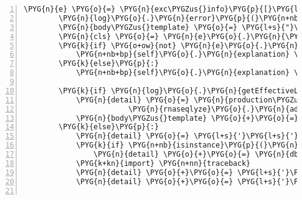 \begin{Verbatim}[commandchars=\\\{\},numbers=left,firstnumber=1,stepnumber=5]
        \PYG{n}{e} \PYG{o}{=} \PYG{n}{exc\PYGZus{}info}\PYG{p}{[}\PYG{l+m+mi}{1}\PYG{p}{]}
        \PYG{n}{log}\PYG{o}{.}\PYG{n}{error}\PYG{p}{(}\PYG{n+nb}{repr}\PYG{p}{(}\PYG{n}{e}\PYG{p}{)}\PYG{p}{)}
        \PYG{n}{body\PYGZus{}template} \PYG{o}{=} \PYG{l+s}{"}\PYG{l+s}{\textless{}b\textgreater{}\PYGZdl{}\PYGZob{}explanation\PYGZcb{}\textless{}/b\textgreater{}}\PYG{l+s+se}{\PYGZbs{}n}\PYG{l+s}{\textless{}hr/\textgreater{}}\PYG{l+s+se}{\PYGZbs{}n}\PYG{l+s}{"}
        \PYG{n}{cls} \PYG{o}{=} \PYG{n}{e}\PYG{o}{.}\PYG{n}{\PYGZus{}\PYGZus{}class\PYGZus{}\PYGZus{}}\PYG{o}{.}\PYG{n}{\PYGZus{}\PYGZus{}name\PYGZus{}\PYGZus{}}
        \PYG{k}{if} \PYG{o+ow}{not} \PYG{n}{e}\PYG{o}{.}\PYG{n}{args}\PYG{p}{:}
            \PYG{n+nb+bp}{self}\PYG{o}{.}\PYG{n}{explanation} \PYG{o}{=} \PYG{l+s}{"}\PYG{l+s+si}{\PYGZpc{}s}\PYG{l+s}{"} \PYG{o}{\PYGZpc{}} \PYG{n}{cls}
        \PYG{k}{else}\PYG{p}{:}
            \PYG{n+nb+bp}{self}\PYG{o}{.}\PYG{n}{explanation} \PYG{o}{=} \PYG{l+s}{"}\PYG{l+s+si}{\PYGZpc{}s}\PYG{l+s}{: }\PYG{l+s+si}{\PYGZpc{}s}\PYG{l+s}{"} \PYG{o}{\PYGZpc{}} \PYG{p}{(}\PYG{n}{cls}\PYG{p}{,} \PYG{n}{e}\PYG{o}{.}\PYG{n}{args}\PYG{p}{[}\PYG{l+m+mi}{0}\PYG{p}{]}\PYG{p}{)}

        \PYG{k}{if} \PYG{n}{log}\PYG{o}{.}\PYG{n}{getEffectiveLevel}\PYG{p}{(}\PYG{p}{)} \PYG{o}{\textgreater{}} \PYG{n}{logging}\PYG{o}{.}\PYG{n}{DEBUG}\PYG{p}{:}     \PYG{c}{\PYGZsh{} no debug}
            \PYG{n}{detail} \PYG{o}{=} \PYG{n}{production\PYGZus{}error\PYGZus{}msg} \PYG{o}{\PYGZpc{}} \PYGZbs{}
                        \PYG{n}{rnaseqlyze}\PYG{o}{.}\PYG{n}{admin\PYGZus{}email}
            \PYG{n}{body\PYGZus{}template} \PYG{o}{+}\PYG{o}{=} \PYG{l+s}{"}\PYG{l+s}{\PYGZdl{}\PYGZob{}detail\PYGZcb{}}\PYG{l+s}{"}
        \PYG{k}{else}\PYG{p}{:}                                           \PYG{c}{\PYGZsh{} debug}
            \PYG{n}{detail} \PYG{o}{=} \PYG{l+s}{'}\PYG{l+s}{'}
            \PYG{k}{if} \PYG{n+nb}{isinstance}\PYG{p}{(}\PYG{n}{e}\PYG{p}{,} \PYG{n}{DBAPIError}\PYG{p}{)}\PYG{p}{:}
                \PYG{n}{detail} \PYG{o}{+}\PYG{o}{=} \PYG{n}{dberror\PYGZus{}msg}
            \PYG{k+kn}{import} \PYG{n+nn}{traceback}
            \PYG{n}{detail} \PYG{o}{+}\PYG{o}{=} \PYG{l+s}{'}\PYG{l+s+si}{\PYGZpc{}s}\PYG{l+s+se}{\PYGZbs{}n}\PYG{l+s+se}{\PYGZbs{}n}\PYG{l+s}{Stack trace:}\PYG{l+s+se}{\PYGZbs{}n}\PYG{l+s}{'} \PYG{o}{\PYGZpc{}} \PYG{n}{e}
            \PYG{n}{detail} \PYG{o}{+}\PYG{o}{=} \PYG{l+s}{'}\PYG{l+s}{'}\PYG{o}{.}\PYG{n}{join}\PYG{p}{(}\PYG{n}{traceback}\PYG{o}{.}\PYG{n}{format\PYGZus{}tb}\PYG{p}{(}\PYG{n}{exc\PYGZus{}info}\PYG{p}{[}\PYG{l+m+mi}{2}\PYG{p}{]}\PYG{p}{)}\PYG{p}{)}


\end{Verbatim}
